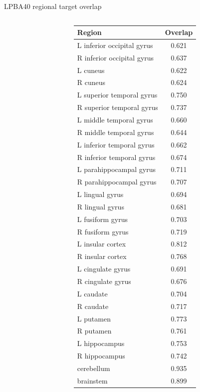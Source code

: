 \documentclass[xcolor=dvipsnames,serif,10pt]{beamer}
\begin{document}
\begin{frame}{LPBA40 regional target overlap}
\begin{columns}[totalwidth=0.7\textwidth,t]
\begin{column}[t]{5cm}
\begin{tabular}{lc}
\hline
\end{tabular}
\end{column}
\begin{column}[t]{5cm}
\begin{tabular}{lc}
{\bf Region} & {\bf Overlap} \\
\hline
L inferior occipital gyrus & 0.621 \\
R inferior occipital gyrus & 0.637 \\
L cuneus & 0.622 \\
R cuneus & 0.624 \\
L superior temporal gyrus & 0.750 \\
R superior temporal gyrus & 0.737 \\
L middle temporal gyrus & 0.660 \\
R middle temporal gyrus & 0.644 \\
L inferior temporal gyrus & 0.662 \\
R inferior temporal gyrus & 0.674 \\
L parahippocampal gyrus & 0.711 \\
R parahippocampal gyrus & 0.707 \\
L lingual gyrus & 0.694 \\
R lingual gyrus & 0.681 \\
L fusiform gyrus & 0.703 \\
R fusiform gyrus & 0.719 \\
L insular cortex & 0.812 \\
R insular cortex & 0.768 \\
L cingulate gyrus & 0.691 \\
R cingulate gyrus & 0.676 \\
L caudate & 0.704 \\
R caudate & 0.717 \\
L putamen & 0.773 \\
R putamen & 0.761 \\
L hippocampus & 0.753 \\
R hippocampus & 0.742 \\
cerebellum & 0.935 \\
brainstem & 0.899 \\
\hline
\end{tabular}
\end{column}
\end{columns}

\end{frame}

\end{document}
